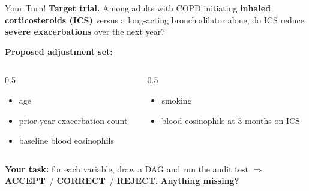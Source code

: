 \documentclass[aspectratio=169]{beamer}
\newcommand{\vaccept}{\textcolor{good}{\textbf{ACCEPT}}}
\newcommand{\vcorrect}{\textcolor{accent}{\textbf{CORRECT}}}
\newcommand{\vreject}{\textcolor{brick}{\textbf{REJECT}}}
\begin{document}
\begin{frame}{Your Turn!}
  \small
  \textbf{Target trial.} Among adults with COPD initiating \textbf{inhaled
  corticosteroids (ICS)} versus a long-acting bronchodilator alone, do ICS reduce
  \textbf{severe exacerbations} over the next year?
  \vspace{0.6em}

  \textbf{Proposed adjustment set:}
  \begin{columns}[T]
    \begin{column}{0.5\textwidth}
      \begin{itemize}
        \item age
        \item prior-year exacerbation count
        \item baseline blood eosinophils
      \end{itemize}
    \end{column}
    \begin{column}{0.5\textwidth}
      \begin{itemize}
        \item smoking
        \item blood eosinophils at 3 months on ICS
      \end{itemize}
    \end{column}
  \end{columns}
  \vspace{0.5em}

  \textcolor{accent}{\textbf{Your task:}} for each variable, draw a DAG and run the audit test
  $\Rightarrow$ \vaccept\ / \vcorrect\ / \vreject.
  \textbf{Anything missing?}
\end{frame}
\end{document}
